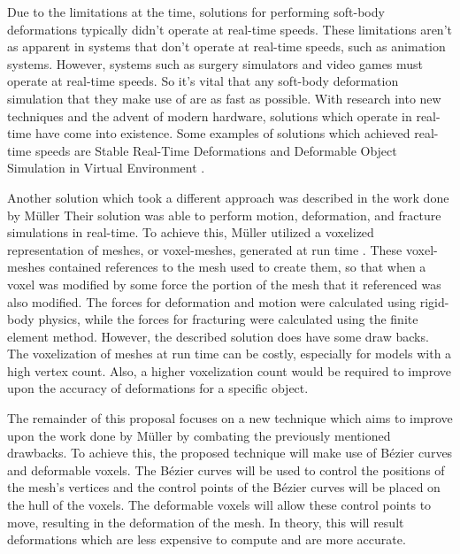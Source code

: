 Due to the limitations at the time, solutions for performing soft-body deformations typically didn't
operate at real-time speeds. These limitations aren't as apparent in systems that don't operate at
real-time speeds, such as animation systems. However, systems such as surgery simulators and video
games must operate at real-time speeds. So it's vital that any soft-body deformation simulation that
they make use of are as fast as possible. With research into new techniques and the advent of modern
hardware, solutions which operate in real-time have come into existence. Some examples of solutions 
which achieved real-time speeds
are Stable Real-Time Deformations \cite{Stable-Real-Time-Deformations} and Deformable Object 
Simulation in Virtual Environment \cite{Deformable-Object-Simulation-in-Virtual-Environment}.

Another solution which took a different approach was described in the work done by Müller \etal 
Their solution was able to perform motion, deformation, and fracture 
simulations in real-time. To achieve this, Müller \etal utilized a voxelized representation of 
meshes, or voxel-meshes, generated at run time \cite{Muller_Teschner_Gross}. These voxel-meshes 
contained references
to the mesh used to create them, so that when a voxel  was modified by some force the portion of 
the mesh that it referenced was also modified. The forces for deformation and motion were calculated 
using rigid-body physics, while the forces for fracturing were calculated using the finite element 
method. However, the described solution does have some draw backs. The voxelization of meshes at run
time can be costly, especially for models with a high vertex count. Also, a higher voxelization 
count would be required to improve upon the accuracy of deformations for a specific object. 

The remainder of this proposal focuses on a new technique which aims to improve upon the work
done by Müller \etal by combating the previously mentioned drawbacks. To achieve this, the proposed
technique will make use of 
Bézier curves and deformable voxels. The Bézier curves will be used to control the positions of the
mesh's vertices and the control points of the Bézier curves will be placed on the hull of the voxels.
The deformable voxels will allow these control points to move, resulting in the deformation of the 
mesh. In theory, this will result deformations which are less expensive to compute and are more 
accurate.

